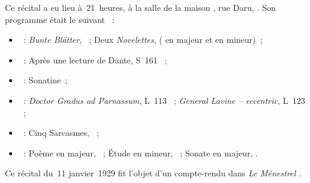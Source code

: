 Ce récital a eu lieu à~21~heures, à la salle \Chopin{} de la maison
\Pleyel{}, rue Daru, .
Son programme était le suivant \citep[voir][]{Heugel4836, Nekrasova08,
Semaine346, White}~:
\begin{itemize}
 \item
 \Schumann{}~: \emph{Bunte Blätter}, ~; Deux \emph{Novelettes},
  ( en \kE majeur et  en \kF \Sharp mineur)~;
 \item
 \Liszt{}~: Après une lecture de Dante, S~161 ~;
 \item
 \Ravel{}~: Sonatine~;
 \item
 \Debussy{}~: \emph{Doctor Gradus ad Parnassum}, L~113 ~;
 \emph{General Lavine -- eccentric}, L~123 ~;
 \item
 \Prokofiev{}~: Cinq Sarcasmes, ~;
 \item
 \Scriabine{}~: Poème en \kF \Sharp majeur,  ~; Étude en
 \kD \Sharp mineur,  ~; Sonate  en \kF \Sharp
 majeur, .
\end{itemize}

Ce récital du~11 janvier~1929 fit l'objet d'un compte-rendu dans \emph{Le
Ménestrel} \citep[voir][]{Baruzi}.

